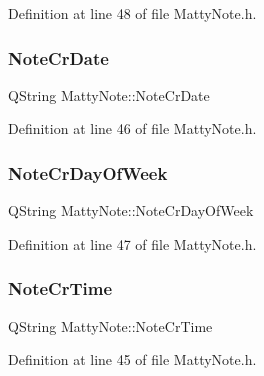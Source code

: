 Definition at line 48 of file Matty\+Note.\+h.

\hypertarget{classMattyNote_a3b94a4b062d2c2335f410f252210ed20}{}\label{classMattyNote_a3b94a4b062d2c2335f410f252210ed20} 
\subsubsection{\texorpdfstring{Note\+Cr\+Date}{NoteCrDate}}
{\footnotesize\ttfamily Q\+String Matty\+Note\+::\+Note\+Cr\+Date\hspace{0.3cm}{\ttfamily [private]}}



Definition at line 46 of file Matty\+Note.\+h.

\hypertarget{classMattyNote_a3776d088e67ef0181116b1cc2db3fd94}{}\label{classMattyNote_a3776d088e67ef0181116b1cc2db3fd94} 
\subsubsection{\texorpdfstring{Note\+Cr\+Day\+Of\+Week}{NoteCrDayOfWeek}}
{\footnotesize\ttfamily Q\+String Matty\+Note\+::\+Note\+Cr\+Day\+Of\+Week\hspace{0.3cm}{\ttfamily [private]}}



Definition at line 47 of file Matty\+Note.\+h.

\hypertarget{classMattyNote_a03208145949dfb98a99cfd9d95373418}{}\label{classMattyNote_a03208145949dfb98a99cfd9d95373418} 
\subsubsection{\texorpdfstring{Note\+Cr\+Time}{NoteCrTime}}
{\footnotesize\ttfamily Q\+String Matty\+Note\+::\+Note\+Cr\+Time\hspace{0.3cm}{\ttfamily [private]}}



Definition at line 45 of file Matty\+Note.\+h.

\hypertarget{classMattyNote_a1182beac3edac3a7a7e4cdce72fc02ce}{}\label{classMattyNote_a1182beac3edac3a7a7e4cdce72fc02ce} 
